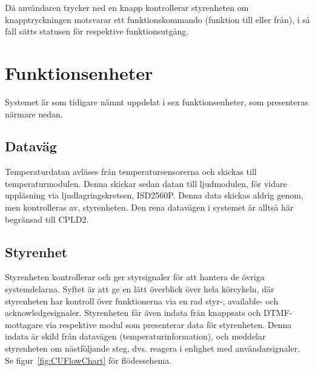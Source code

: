 \documentclass[a4paper,11pt]{article}
\begin{document}
Då användaren trycker ned en knapp kontrollerar styrenheten om knapptryckningen motsvarar ett funktionskommando (funktion till eller från), i så fall sätts statusen för respektive funktionsutgång.

\pagebreak

\section{Funktionsenheter}
\label{sec:Funktionsenheter}

Systemet är som tidigare nämnt uppdelat i sex funktionsenheter, som presenteras närmare nedan.

	\subsection{Dataväg}
	Temperaturdatan avläses från temperatursensorerna och skickas till temperaturmodulen. Denna skickar sedan datan till ljudmodulen, för vidare uppläsning via ljudlagringskretsen, ISD2560P. Denna data skickas aldrig genom, men kontrolleras av, styrenheten. Den rena datavägen i systemet är alltså här begränsad till CPLD2.
	
	\subsection{Styrenhet}

	Styrenheten kontrollerar och ger styrsignaler för att hantera de övriga systemdelarna. Syftet är att ge en lätt överblick över hela körcykeln, där styrenheten har kontroll över funktionerna via en rad styr-, available- och acknowledgesignaler. Styrenheten får även indata från knappsats och DTMF-mottagare via respektive modul som presenterar data för styrenheten. Denna indata är skild från datavägen (temperaturinformation), och meddelar styrenheten om nästföljande steg, dvs. reagera i enlighet med användarsignaler. Se figur~\ref{fig:CUFlowChart} för flödesschema.
\end{document}
